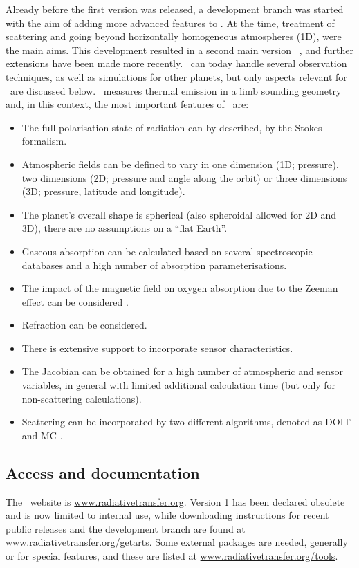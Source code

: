 Already before the first version was released, a development branch was started
with the aim of adding more advanced features to \ARTS. At the time, treatment
of scattering and going beyond horizontally homogeneous atmospheres (1D), were
the main aims. This development resulted in a second main version \ARTS\
\citep{eriksson:arts2:11}, and further extensions have been made more recently.
\ARTS\ can today handle several observation techniques, as well as simulations
for other planets, but only aspects relevant for \smr\ are discussed below.
\smr\ measures thermal emission in a limb sounding geometry and, in this
context, the most important features of \ARTS\ are:
\begin{itemize}
\item The full polarisation state of radiation can by described, by the Stokes
  formalism.
\item Atmospheric fields can be defined to vary in one dimension (1D;
  pressure), two dimensions (2D; pressure and angle along the orbit) or three
  dimensions (3D; pressure, latitude and longitude).
\item The planet's overall shape is spherical (also spheroidal allowed for 2D
  and 3D), there are no assumptions on a ``flat Earth''.
\item Gaseous absorption can be calculated based on several spectroscopic
  databases and a high number of absorption parameterisations.
\item The impact of the magnetic field on oxygen absorption due to the Zeeman
  effect can be considered \citep{larsson:zeema:14}.
\item Refraction can be considered.
\item There is extensive support to incorporate sensor characteristics.
\item The Jacobian can be obtained for a high number of atmospheric and sensor
  variables, in general with limited additional calculation time (but only
  for non-scattering calculations).
\item Scattering can be incorporated by two different algorithms, denoted as DOIT
  \citep{emde:apoli:04} and MC \citep{davisetal:04}.
\end{itemize}



\subsection{Access and documentation}
%
The \ARTS\ website is \url{www.radiativetransfer.org}. Version 1
has been declared obsolete and is now limited to internal use, while downloading
instructions for recent public releases and the development branch are found
at \url{www.radiativetransfer.org/getarts}. Some external packages are needed,
generally or for special features, and these are listed at
\url{www.radiativetransfer.org/tools}.

